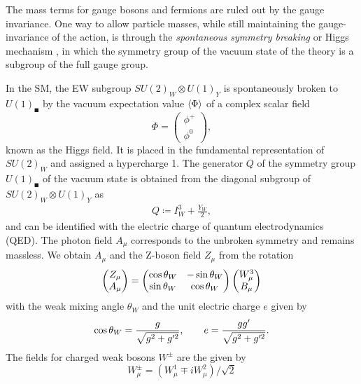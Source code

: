 The mass terms for gauge bosons and fermions are ruled out by the gauge invariance.
One way to allow particle masses, while still maintaining the gauge-invariance of the action, is through 
the \emph{spontaneous symmetry breaking} or Higgs mechanism \cite{Higgs1964b,Higgs1964,Englert1964,Higgs1966}, in which
the symmetry group of the vacuum state of the theory is a subgroup of the full gauge group. 

In the SM, the EW subgroup  $SU(2)_W \otimes U(1)_Y$ is spontaneously broken
to $U(1)_\QED$ by the vacuum expectation value $\expval{\Phi}$ of a complex scalar field
\[
\Phi = \begin{pmatrix}
  \phi^+ \\ \phi^0
\end{pmatrix},
\]
known as the Higgs field. It is placed in the fundamental representation of $SU(2)_W$ and assigned a hypercharge 1.
The generator $Q$ of the symmetry group $U(1)_\QED$ of the vacuum state is obtained from the diagonal subgroup 
of $SU(2)_W \otimes U(1)_Y$ as
\begin{align}\label{eq:GMN}
  Q\coloneqq I^3_W+\frac{Y_W}{2},
\end{align}
and can be identified with the electric charge of quantum electrodynamics (QED). 
The photon field $A_\mu$ corresponds to the unbroken symmetry and remains massless.
We obtain $A_\mu$ and the Z-boson field $Z_\mu$ from the rotation
\begin{equation}
  \begin{pmatrix}
    Z_\mu \\ A_\mu
  \end{pmatrix} = \begin{pmatrix}
    \cos \theta_W & -\sin \theta_W \\ \sin \theta_W & \cos \theta_W
  \end{pmatrix}
  \begin{pmatrix}
    W^3_\mu \\ B_\mu
  \end{pmatrix}
\end{equation}
with the weak mixing angle $\theta_W$ and the unit electric charge $e$ given by
\begin{equation}
  \cos \theta_W =  \frac{g}{\sqrt{g^2+g^{\prime 2}}},
  \qquad
  e = \frac{gg'}{\sqrt{g^2+g^{\prime 2}}}.
\end{equation}
The fields for charged weak bosons $W^{\pm}$ are the given by
\begin{equation}
  W^\pm_\mu = (W^1_\mu\mp i W^2_\mu)/\sqrt{2}
\end{equation}


